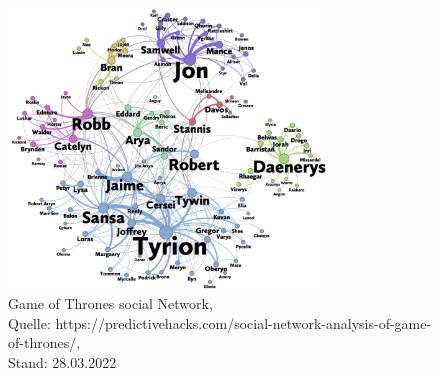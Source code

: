 \begin{figure}[h!]
    \centering
    \includegraphics[width=0.75\textwidth]{Graphics/got-network.png}
    \caption{Game of Thrones social Network,\\
    Quelle: https://predictivehacks.com/social-network-analysis-of-game-of-thrones/,\\ Stand: 28.03.2022}
    \label{fig:GameOfThrones}
\end{figure}

